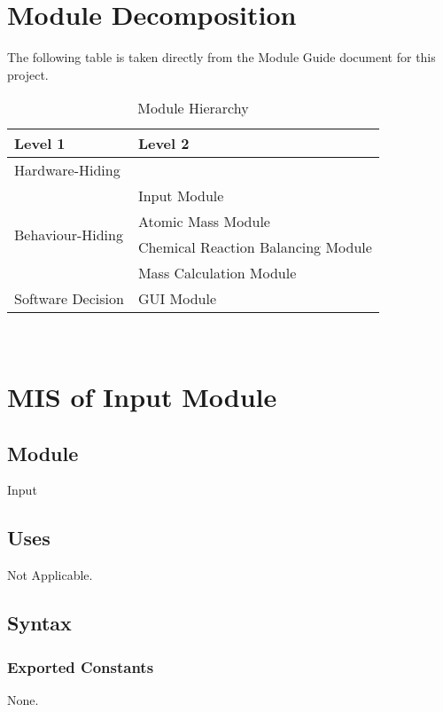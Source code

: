 \documentclass[12pt, titlepage]{article}
\begin{document}
\section{Module Decomposition}

The following table is taken directly from the Module Guide document for this project.

\begin{table}[h!]
\centering
\begin{tabular}{p{} p{}}
\toprule
\textbf{Level 1} & \textbf{Level 2}\\
\midrule

{Hardware-Hiding} & ~ \\
\midrule

\multirow{4}{0.3\textwidth}{Behaviour-Hiding}  &Input Module \\
& Atomic Mass Module\\
&Chemical Reaction Balancing Module\\
& Mass Calculation Module\\
\midrule

\multirow{1}{0.3\textwidth}{Software Decision} & GUI Module\\
\bottomrule

\end{tabular}
\caption{Module Hierarchy}
\label{TblMH}
\end{table}


~\newpage

\section{MIS of Input Module} \label{input} 

\subsection{Module}

Input

\subsection{Uses}

Not Applicable.

\subsection{Syntax}

\subsubsection{Exported Constants}
None.
\end{document}
